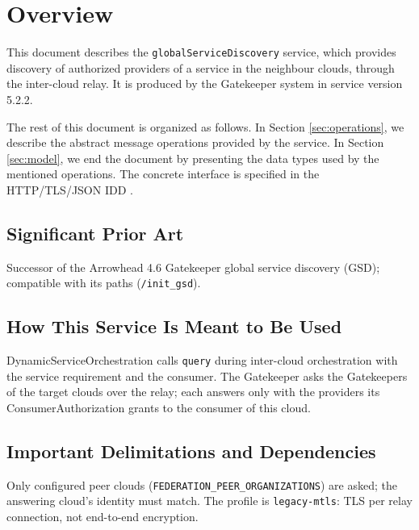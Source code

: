 \documentclass[a4paper]{arrowhead}
\begin{document}
\section{Overview}
\label{sec:overview}

This document describes the \texttt{global\allowbreak{}Service\allowbreak{}Discovery} service, which provides discovery of authorized providers of a service in the neighbour clouds, through the inter-cloud relay.
It is produced by the Gatekeeper system \cite{gk-sysd} in service version 5.2.2.

The rest of this document is organized as follows.
In Section \ref{sec:operations}, we describe the abstract message operations provided by the service.
In Section \ref{sec:model}, we end the document by presenting the data types used by the mentioned operations.
The concrete interface is specified in the HTTP/TLS/JSON IDD \cite{gk-globalServiceDiscovery-http-idd}.

\subsection{Significant Prior Art}

Successor of the Arrowhead 4.6 Gatekeeper global service discovery (GSD); compatible with its paths (\texttt{/\allowbreak{}init\_\allowbreak{}gsd}).

\subsection{How This Service Is Meant to Be Used}

Dynamic\allowbreak{}Service\allowbreak{}Orchestration calls \texttt{query} during inter-cloud orchestration with the service requirement and the consumer. The Gatekeeper asks the Gatekeepers of the target clouds over the relay; each answers only with the providers its Consumer\allowbreak{}Authorization grants to the consumer of this cloud.

\subsection{Important Delimitations and Dependencies}
\label{sec:delimitations}

Only configured peer clouds (\texttt{FEDERATION\_\allowbreak{}PEER\_\allowbreak{}ORGANIZATIONS}) are asked; the answering cloud's identity must match. The profile is \texttt{legacy-\allowbreak{}mtls}: TLS per relay connection, not end-to-end encryption.
\end{document}
